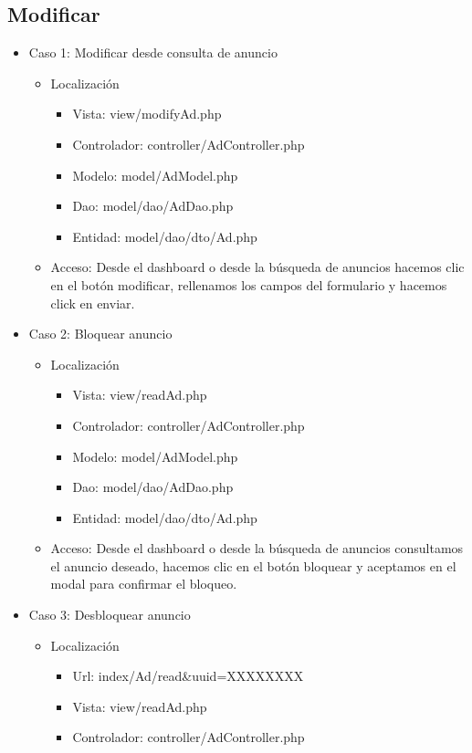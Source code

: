 \subsection{Modificar}
\begin{itemize}
\item Caso 1: Modificar desde consulta de anuncio
\begin{itemize}
\item Localizaci\'{o}n
\begin{itemize}
\item Vista: view/modifyAd.php
\item Controlador: controller/AdController.php
\item Modelo: model/AdModel.php
\item Dao: model/dao/AdDao.php
\item Entidad: model/dao/dto/Ad.php
\end{itemize}
\item Acceso: Desde el dashboard o desde la b\'{u}squeda de anuncios hacemos clic en el bot\'{o}n modificar, rellenamos los campos del formulario y hacemos click en enviar.
\end{itemize}
\item Caso 2: Bloquear anuncio
\begin{itemize}
\item Localizaci\'{o}n
\begin{itemize}
\item Vista: view/readAd.php
\item Controlador: controller/AdController.php
\item Modelo: model/AdModel.php
\item Dao: model/dao/AdDao.php
\item Entidad: model/dao/dto/Ad.php
\end{itemize}
\item Acceso: Desde el dashboard o desde la b\'{u}squeda de anuncios consultamos el anuncio deseado, hacemos clic en el bot\'{o}n bloquear y aceptamos en el modal para confirmar el bloqueo.
\end{itemize}
\item Caso 3: Desbloquear anuncio
\begin{itemize}
\item Localizaci\'{o}n
\begin{itemize}
\item Url: index/Ad/read\&uuid=XXXXXXXX
\item Vista: view/readAd.php
\item Controlador: controller/AdController.php

\end{itemize}
\end{itemize}
\end{itemize}
